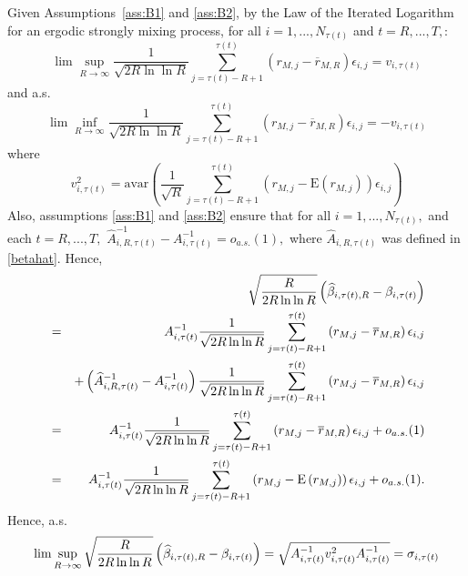 Given Assumptions~\ref{ass:B1} and \ref{ass:B2}, by the Law of the Iterated Logarithm for an ergodic strongly mixing process, for all $i=1,...,N_{\tau(t)}$ and $t=R,...,T,$:
\begin{equation*}
\lim \sup_{R\rightarrow \infty }\frac{1}{\sqrt{2R\ln \ln R}}%
\sum_{j=\tau(t)-R+1}^{\tau(t)}\left( r_{M,j}-\overline{r}_{M,R}\right) \epsilon
_{i,j}=v_{i,\tau(t)}
\end{equation*}%
and a.s.%
\begin{equation*}
\lim \inf_{R\rightarrow \infty }\frac{1}{\sqrt{2R\ln \ln R}}%
\sum_{j=\tau(t)-R+1}^{\tau(t)}\left( r_{M,j}-\overline{r}_{M,R}\right) \epsilon
_{i,j}=-v_{i,\tau(t)}
\end{equation*}%
where 
\begin{equation*}
v_{i,\tau(t)}^{2}=\mathrm{avar}\left( \frac{1}{\sqrt{R}}\sum_{j=\tau(t)-R+1}^{\tau(t)}\left( r_{M,j}-\mathrm{E}\left( r_{M,j}\right) \right)
\epsilon _{i,j}\right)
\end{equation*}%
Also, assumptions \ref{ass:B1} and \ref{ass:B2} ensure that for all $i=1,...,N_{\tau(t)},$ and
each $t=R,...,T,$ $\widehat{A}_{i,R,\tau(t)}^{-1}-A_{i,\tau(t)}^{-1}=o_{a.s.}%
(1),$ where $\widehat{A}_{i,R,\tau(t)}$ was defined in \eqref{betahat}. Hence,%
\begin{eqnarray*}
&&\sqrt{\frac{R}{2R\ln \ln R}}\left( \widehat{\beta }_{i,\tau(t),R}-\beta _{i,\tau(t)}\right) \\
&=&A_{i,\tau(t)}^{-1}\frac{1}{\sqrt{2R\ln \ln R}}%
\sum_{j=\tau(t)-R+1}^{\tau(t)}\left( r_{M,j}-\overline{r}_{M,R}\right) \epsilon _{i,j} \\
&&+\left( \widehat{A}_{i,R,\tau(t)}^{-1}-A_{i,\tau(t)}^{-1}\right) \frac{1}{\sqrt{%
2R\ln \ln R}}\sum_{j=\tau(t)-R+1}^{\tau(t)}\left( r_{M,j}-\overline{r}_{M,R}\right) \epsilon
_{i,j} \\
&=&A_{i,\tau(t)}^{-1}\frac{1}{\sqrt{2R\ln \ln R}}%
\sum_{j=\tau(t)-R+1}^{\tau(t)}\left( r_{M,j}-\overline{r}_{M,R}\right) \epsilon
_{i,j}+o_{a.s.}(1) \\
&=&A_{i,\tau(t)}^{-1}\frac{1}{\sqrt{2R\ln \ln R}}%
\sum_{j=\tau(t)-R+1}^{\tau(t)}\left( r_{M,j}-\mathrm{E}\left( r_{M,j}\right) \right)
\epsilon _{i,j}+o_{a.s.}(1).
\end{eqnarray*}%
Hence, a.s.%
\begin{equation*}
\lim \sup_{R\rightarrow \infty }\sqrt{\frac{R}{2R\ln \ln R}}\left( \widehat{%
\beta }_{i,\tau(t),R}-\beta _{i,\tau(t)}\right) =\sqrt{A_{i,\tau(t)}^{-1}v_{i,\tau(t)}^{2}A_{i,\tau(t)}^{-1}}=\sigma _{i,\tau(t)}
\end{equation*}%
